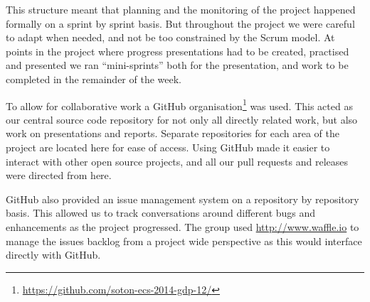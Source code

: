 This structure meant that planning and the monitoring of the project happened formally on a sprint by sprint basis. But throughout the project we were careful to adapt when needed, and not be too constrained by the Scrum model. At points in the project where progress presentations had to be created, practised and presented we ran ``mini-sprints'' both for the presentation, and work to be completed in the remainder of the week.



To allow for collaborative work a GitHub organisation\footnote{\url{https://github.com/soton-ecs-2014-gdp-12/}} was used. This acted as our central source code repository for not only all directly related work, but also work on presentations and reports. Separate repositories for each area of the project are located here for ease of access. Using GitHub made it easier to interact with other open source projects, and all our pull requests and releases were directed from here. 

GitHub also provided an issue management system on a repository by repository basis. This allowed us to track conversations around different bugs and enhancements as the project progressed.
The group used \url{http://www.waffle.io} to manage the issues backlog from a project wide perspective as this would interface directly with GitHub.




